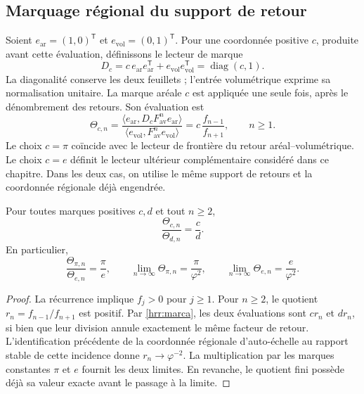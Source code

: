 \subsection{Marquage régional du support de retour}

Soient \(e_{\mathrm{ar}}=(1,0)^{\mathsf T}\) et \(e_{\mathrm{vol}}=(0,1)^{\mathsf T}\). Pour une coordonnée positive \(c\), produite avant cette évaluation, définissons le lecteur de marque
\[
 D_c=c\,e_{\mathrm{ar}}e_{\mathrm{ar}}^{\mathsf T}
       +e_{\mathrm{vol}}e_{\mathrm{vol}}^{\mathsf T}
     =\operatorname{diag}(c,1).
\]
La diagonalité conserve les deux feuillets ; l’entrée volumétrique exprime sa normalisation unitaire. La marque aréale \(c\) est appliquée une seule fois, après le dénombrement des retours. Son évaluation est
\begin{equation}
 \Theta_{c,n}=
 \frac{\langle e_{\mathrm{ar}},D_c F_{\mathrm{av}}^n
 e_{\mathrm{ar}}\rangle}
 {\langle e_{\mathrm{vol}},F_{\mathrm{av}}^n
 e_{\mathrm{vol}}\rangle}
 =c\,\frac{f_{n-1}}{f_{n+1}},\qquad n\geq1.
 \label{hrr:marca}
\end{equation}
Le choix \(c=\pi\) coïncide avec le lecteur de frontière du retour aréal--volumétrique. Le choix \(c=e\) définit le lecteur ultérieur complémentaire considéré dans ce chapitre. Dans les deux cas, on utilise le même support de retours et la coordonnée régionale déjà engendrée.

\begin{theorem}
\label{hrr:cociente} Pour toutes marques positives \(c,d\) et tout \(n\geq2\),
\begin{equation}
 \frac{\Theta_{c,n}}{\Theta_{d,n}}=\frac cd.
 \label{hrr:cociente-exacto}
\end{equation}
En particulier,
\begin{equation}
 \frac{\Theta_{\pi,n}}{\Theta_{e,n}}=\frac\pi e,
 \qquad
 \lim_{n\to\infty}\Theta_{\pi,n}=\frac\pi{\varphi^2},
 \qquad
 \lim_{n\to\infty}\Theta_{e,n}=\frac e{\varphi^2}.
 \label{hrr:pi-e-phi}
\end{equation}
\end{theorem}
\begin{proof}
La récurrence implique \(f_j>0\) pour \(j\geq1\). Pour \(n\geq2\), le quotient \(r_n=f_{n-1}/f_{n+1}\) est positif. Par \eqref{hrr:marca}, les deux évaluations sont \(cr_n\) et \(dr_n\), si bien que leur division annule exactement le même facteur de retour. L’identification précédente de la coordonnée régionale d’auto-échelle au rapport stable de cette incidence donne \(r_n\to\varphi^{-2}\). La multiplication par les marques constantes \(\pi\) et \(e\) fournit les deux limites. En revanche, le quotient fini possède déjà sa valeur exacte avant le passage à la limite.
\end{proof}

